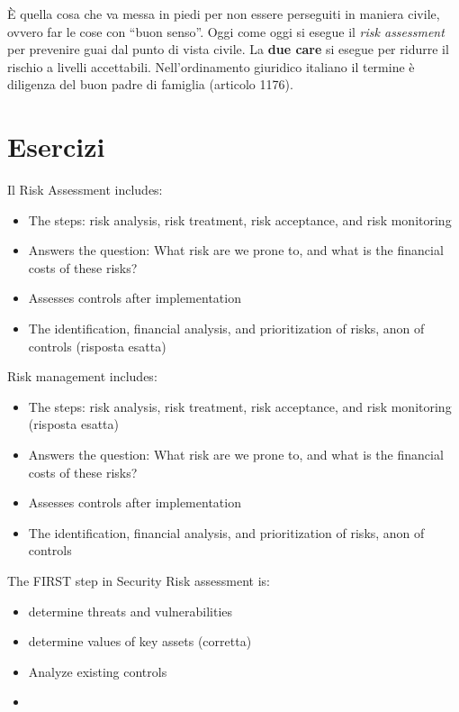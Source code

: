 È quella cosa che va messa in piedi per non essere perseguiti in maniera civile,
ovvero far le cose con ``buon senso''. Oggi come oggi si esegue il \textit{risk
assessment} per prevenire guai dal punto di vista civile. La \textbf{due care}
si esegue per ridurre il rischio a livelli accettabili. Nell'ordinamento
giuridico italiano il termine è diligenza del buon padre di famiglia (articolo
1176).


\section{Esercizi}

Il Risk Assessment includes:
\begin{itemize}
\item The steps: risk analysis, risk treatment, risk acceptance, and risk
monitoring
\item Answers the question: What risk are we prone to, and what is the financial
costs of these risks?
\item Assesses controls after implementation
\item The identification, financial analysis, and prioritization of risks, anon
of controls (risposta esatta)
\end{itemize}


Risk management includes:
\begin{itemize}
\item The steps: risk analysis, risk treatment, risk acceptance, and risk
monitoring (risposta esatta)
\item Answers the question: What risk are we prone to, and what is the financial
costs of these risks?
\item Assesses controls after implementation
\item The identification, financial analysis, and prioritization of risks, anon
of controls
\end{itemize}

The FIRST step in Security Risk assessment is:
\begin{itemize}
\item determine threats and vulnerabilities
\item determine values of key assets (corretta)
\item Analyze existing controls
\item
\end{itemize}



